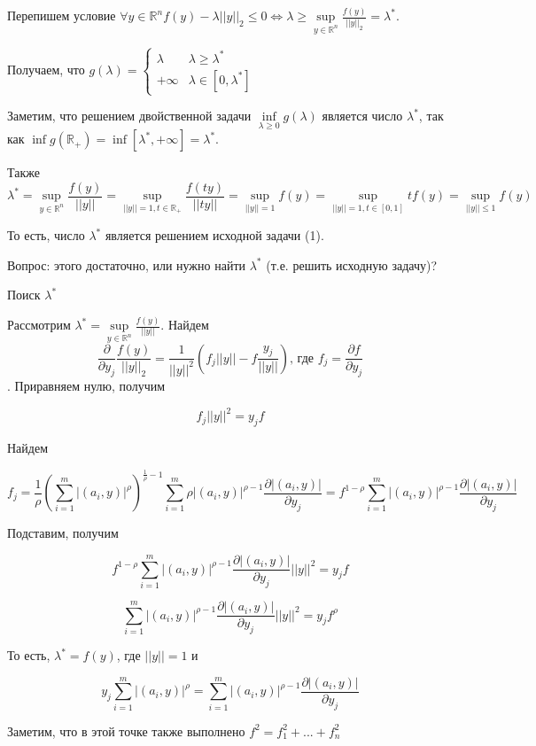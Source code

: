 \documentclass[a4paper]{article}
\begin{document}
Перепишем условие $\forall y\in\mathbb{R}^n f(y)-\lambda ||y||_2\leqslant 0\Leftrightarrow \lambda\geqslant \sup\limits_{y\in\mathbb{R}^n}\frac{f(y)}{||y||_2}=\lambda^*$.

Получаем, что $g(\lambda)=\begin{cases}
\lambda & \lambda\geqslant \lambda^*\\
+\infty & \lambda\in[0,\lambda^*]
\end{cases}$

Заметим, что решением двойственной задачи $\inf\limits_{\lambda\geqslant 0}g(\lambda)$ является число $\lambda^*$, так как $\inf g(\mathbb{R}_+)=\inf[\lambda^*,+\infty]=\lambda^*$.

Также
 $$\lambda^*=\sup\limits_{y\in\mathbb{R}^n}\frac{f(y)}{||y||}=\sup\limits_{||y||=1, t\in\mathbb{R}_+}\frac{f(ty)}{||ty||}=\sup\limits_{||y||=1}f(y)=\sup\limits_{||y||=1,t\in[0,1]}tf(y)=\sup\limits_{||y||\leqslant 1}f(y)$$

То есть, число $\lambda^*$ является решением исходной задачи (1).

Вопрос: этого достаточно, или нужно найти $\lambda^*$ (т.е. решить исходную задачу)?

Поиск $\lambda^*$

Рассмотрим $\lambda^*=\sup\limits_{y\in\mathbb{R}^n}\frac{f(y)}{||y||}$. Найдем $$\frac{\partial }{\partial y_j}\frac{f(y)}{||y||_2}=\frac{1}{||y||^2}(f_j||y||-f\frac{y_j}{||y||})\mbox{, где }f_j=\frac{\partial f}{\partial y_j}$$. Приравняем нулю, получим

$$f_j||y||^2=y_jf$$

Найдем

$$f_j=\frac{1}{\rho}\left(\sum\limits_{i=1}^m|(a_i,y)|^\rho\right)^{\frac{1}{\rho}-1}\sum\limits_{i=1}^m\rho |(a_i,y)|^{\rho-1}\frac{\partial |(a_i,y)|}{\partial y_j}=f^{1-\rho}\sum\limits_{i=1}^m|(a_i,y)|^{\rho-1}\frac{\partial |(a_i,y)|}{\partial y_j}$$

Подставим, получим

$$f^{1-\rho}\sum\limits_{i=1}^m|(a_i,y)|^{\rho-1}\frac{\partial |(a_i,y)|}{\partial y_j}||y||^2=y_jf$$

$$\sum\limits_{i=1}^m|(a_i,y)|^{\rho-1}\frac{\partial |(a_i,y)|}{\partial y_j}||y||^2=y_jf^\rho$$

То есть, $\lambda^*=f(y)$, где $||y||=1$ и

$$y_j\sum\limits_{i=1}^m|(a_i,y)|^\rho=\sum\limits_{i=1}^m|(a_i,y)|^{\rho-1}\frac{\partial |(a_i,y)|}{\partial y_j}$$

Заметим, что в этой точке также выполнено $f^2=f_1^2+...+f^2_n$

\end{document}
